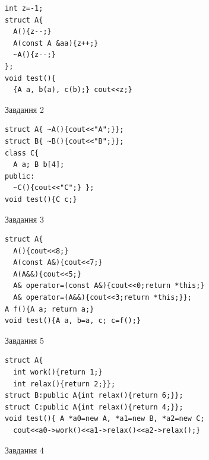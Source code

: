 \documentclass[12pt, ukrainian]{article}
\begin{document}
{{{{{{{{{{{\begin{minipage}[t]{11cm}
\begin{verbatim}
int z=-1;
struct A{
  A(){z--;}
  A(const A &aa){z++;}
  ~A(){z--;}
};
void test(){
  {A a, b(a), c(b);} cout<<z;}
\end{verbatim}            


               
{\begin{center}Завдання {2}\end{center}}
\vspace{-6mm}

\begin{verbatim}
struct A{ ~A(){cout<<"A";}};
struct B{ ~B(){cout<<"B";}};
class C{
  A a; B b[4];
public:
  ~C(){cout<<"C";} };
void test(){C c;}
\end{verbatim}            


               
{\begin{center}Завдання {3}\end{center}}
\vspace{-6mm}

\begin{verbatim}
struct A{
  A(){cout<<8;}
  A(const A&){cout<<7;}
  A(A&&){cout<<5;}
  A& operator=(const A&){cout<<0;return *this;}
  A& operator=(A&&){cout<<3;return *this;}};
A f(){A a; return a;}
void test(){A a, b=a, c; c=f();}
\end{verbatim}            


               
{\begin{center}Завдання {5}\end{center}}
\vspace{-6mm}

\begin{verbatim}
struct A{
  int work(){return 1;}
  int relax(){return 2;}};
struct B:public A{int relax(){return 6;}};
struct C:public A{int relax(){return 4;}};
void test(){ A *a0=new A, *a1=new B, *a2=new C;
  cout<<a0->work()<<a1->relax()<<a2->relax();}
\end{verbatim}            


\end{minipage}
\vline \hspace{8mm}
\begin{minipage}[t]{7cm}
               
{\begin{center}Завдання {4}\end{center}}
\vspace{-6mm}


\end{minipage}}}}}}}}}}}}
\end{document}
